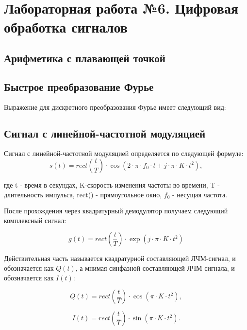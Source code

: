 \documentclass[a4paper,oneside ,14pt]{extreport}
\begin{document}
\chapter{Лабораторная работа №6. Цифровая обработка сигналов}



\section{Арифметика с плавающей точкой}

\section{Быстрое преобразование Фурье}
	Выражение для дискретного преобразования Фурье имеет следующий вид:


\section{Сигнал с линейной-частотной модуляцией}

Сигнал с линейной-частотной модуляцией определяется по следующей формуле:
\begin{equation}	
	s(t) = rect(\frac{t}{T}) \cdot \cos(2 \cdot \pi \cdot f_0 \cdot t + j \cdot \pi \cdot K \cdot t^{2}),
\end{equation}

где t - время в секундах, K-скорость изменения частоты во времени, T - длительность импульса, rect() - прямоугольное окно, \(f_0\) - несущая частота.

После прохождения через квадратурный демодулятор получаем следующий комплексный сигнал:

\begin{equation}	
	g(t) = rect(\frac{t}{T}) \cdot \exp(j \cdot \pi \cdot K \cdot t^{2})
\end{equation}

Действительная часть называется квадратурной
составляющей ЛЧМ-сигнал, и обозначается как \(Q(t)\), а мнимая 
синфазной составляющей ЛЧМ-сигнала, и обозначается как \(I(t)\):

\begin{equation}	
	Q(t) = rect(\frac{t}{T}) \cdot \cos(\pi \cdot K \cdot t^{2}),
\end{equation}

\begin{equation}	
	I(t) = rect(\frac{t}{T}) \cdot \sin(\pi \cdot K \cdot t^{2}).
\end{equation}
\end{document}
